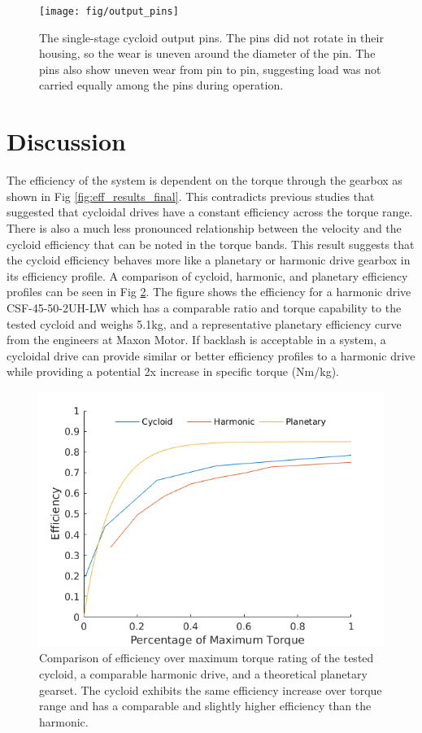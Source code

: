 \begin{figure}[h]
   \centering
   \texttt{[image: fig/output\_pins]}
   \caption{The single-stage cycloid output pins. The pins did not rotate in their housing, so the wear is uneven around the diameter of the pin. The pins also show uneven wear from pin to pin, suggesting load was not carried equally among the pins during operation.}
   \label{fig:single_output_pins}
\end{figure}

\section{Discussion} \label{ch:single:discussion}

The efficiency of the system is dependent on the torque through the gearbox as shown in Fig \ref{fig:eff_results_final}.
This contradicts previous studies that suggested that cycloidal drives have a constant efficiency across the torque range.
There is also a much less pronounced relationship between the velocity and the cycloid efficiency that can be noted in the torque bands.
This result suggests that the cycloid efficiency behaves more like a planetary or harmonic drive gearbox in its efficiency profile.
A comparison of cycloid, harmonic, and planetary efficiency profiles can be seen in Fig \ref{fig:eff_comp}.
The figure shows the efficiency for a harmonic drive CSF-45-50-2UH-LW \cite{ref:harmonic_sheet} which has a comparable ratio and torque capability to the tested cycloid and weighs 5.1kg, and a representative planetary efficiency curve from the engineers at Maxon Motor.
If backlash is acceptable in a system, a cycloidal drive can provide similar or better efficiency profiles to a harmonic drive while providing a potential 2x increase in specific torque (Nm/kg).

\begin{figure}[h]
   \centering
   \includegraphics[width=0.7\linewidth]{fig/eff_comp_v3}
   \caption{Comparison of efficiency over maximum torque rating of the tested cycloid, a comparable harmonic drive, and a theoretical planetary gearset.
   The cycloid exhibits the same efficiency increase over torque range and has a comparable and slightly higher efficiency than the harmonic.}
   \label{fig:eff_comp}
\end{figure}

